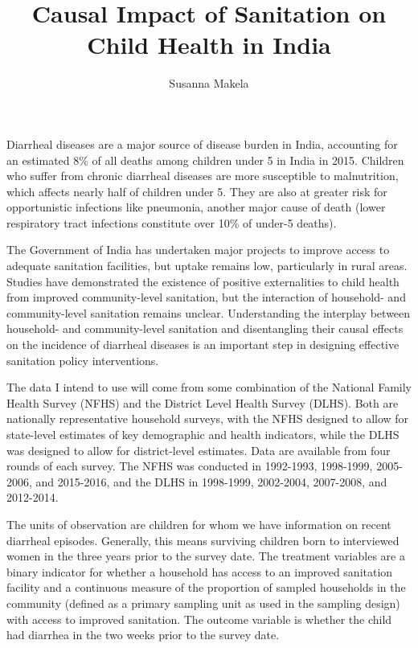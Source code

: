 \documentclass[10pt,a4paper]{article}
\author{Susanna Makela}
\title{Causal Impact of Sanitation on Child Health in India}
\begin{document}
\maketitle

Diarrheal diseases are a major source of disease burden in India, accounting for an estimated 8\% of all deaths among children under 5 in India in 2015. %
Children who suffer from chronic diarrheal diseases are more susceptible to malnutrition, which affects nearly half of children under 5. They are also at greater risk for opportunistic infections like pneumonia, another major cause of death (lower respiratory tract infections constitute over 10\% of under-5 deaths). %

The Government of India has undertaken major projects to improve access to adequate sanitation facilities, but uptake remains low, particularly in rural areas. %
Studies have demonstrated the existence of positive externalities to child health from improved community-level sanitation, but the interaction of household- and community-level sanitation remains unclear. %
Understanding the interplay between household- and community-level sanitation and disentangling their causal effects on the incidence of diarrheal diseases is an important step in designing effective sanitation policy interventions.

The data I intend to use will come from some combination of the National Family Health Survey (NFHS) and the District Level Health Survey (DLHS). Both are nationally representative household surveys, with the NFHS designed to allow for state-level estimates of key demographic and health indicators, while the DLHS was designed to allow for district-level estimates. Data are available from four rounds of each survey. The NFHS was conducted in 1992-1993, 1998-1999, 2005-2006, and 2015-2016, and the DLHS in 1998-1999, 2002-2004, 2007-2008, and 2012-2014.

The units of observation are children for whom we have information on recent diarrheal episodes. Generally, this means surviving children born to interviewed women in the three years prior to the survey date. The treatment variables are a binary indicator for whether a household has access to an improved sanitation facility and a continuous measure of the proportion of sampled households in the community (defined as a primary sampling unit as used in the sampling design) with access to improved sanitation. The outcome variable is whether the child had diarrhea in the two weeks prior to the survey date. 
\end{document}

